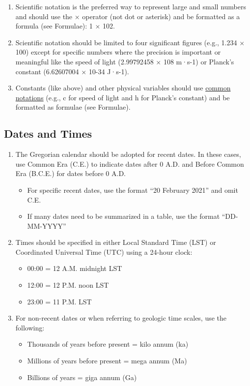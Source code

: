 \documentclass[
]{book}
\providecommand{\tightlist}{%
  \setlength{\itemsep}{0pt}\setlength{\parskip}{0pt}}
\begin{document}
\begin{enumerate}
\def\labelenumi{\arabic{enumi}.}
\tightlist
\item
  Scientific notation is the preferred way to represent large and small numbers and should use the × operator (not dot or asterisk) and be formatted as a formula (see Formulae): 1 × 102.
\item
  Scientific notation should be limited to four significant figures (e.g., 1.234 × 100) except for specific numbers where the precision is important or meaningful like the speed of light (2.99792458 × 108 m·s-1) or Planck's constant (6.62607004 × 10-34 J·s-1).
\item
  Constants (like above) and other physical variables should use \href{https://en.wikipedia.org/wiki/List_of_common_physics_notations}{common notations} (e.g., c for speed of light and h for Planck's constant) and be formatted as formulae (see Formulae).
\end{enumerate}

\hypertarget{dates-and-times}{%
\subsection{Dates and Times}\label{dates-and-times}}

\begin{enumerate}
\def\labelenumi{\arabic{enumi}.}
\tightlist
\item
  The Gregorian calendar should be adopted for recent dates. In these cases, use Common Era (C.E.) to indicate dates after 0 A.D. and Before Common Era (B.C.E.) for dates before 0 A.D.

  \begin{itemize}
  \tightlist
  \item
    For specific recent dates, use the format ``20 February 2021'' and omit C.E.
  \item
    If many dates need to be summarized in a table, use the format ``DD-MM-YYYY''
  \end{itemize}
\item
  Times should be specified in either Local Standard Time (LST) or Coordinated Universal Time (UTC) using a 24-hour clock:

  \begin{itemize}
  \tightlist
  \item
    00:00 = 12 A.M. midnight LST
  \item
    12:00 = 12 P.M. noon LST
  \item
    23:00 = 11 P.M. LST
  \end{itemize}
\item
  For non-recent dates or when referring to geologic time scales, use the following:

  \begin{itemize}
  \tightlist
  \item
    Thousands of years before present = kilo annum (ka)
  \item
    Millions of years before present = mega annum (Ma)
  \item
    Billions of years = giga annum (Ga)
  \end{itemize}
\end{enumerate}
\end{document}
